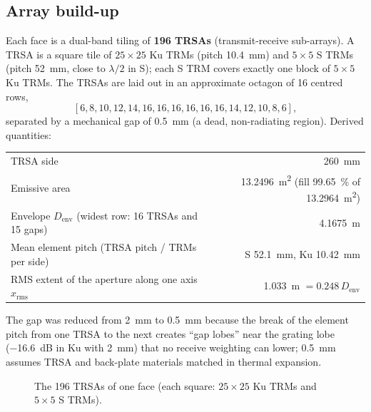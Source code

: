 \documentclass[11pt,a4paper]{article}
\newcommand{\Denv}{D_{\mathrm{env}}}
\begin{document}
\subsection{Array build-up}
Each face is a dual-band tiling of \textbf{196 TRSAs} (transmit-receive sub-arrays). A TRSA is a square tile of
$25\times25$ Ku TRMs (pitch \SI{10.4}{mm}) and $5\times5$ S TRMs (pitch \SI{52}{mm}, close to $\lambda/2$ in S); each
S TRM covers exactly one block of $5\times5$ Ku TRMs. The TRSAs are laid out in an approximate octagon of 16 centred
rows,
\[
  [6, 8, 10, 12, 14, 16, 16, 16, 16, 16, 16, 14, 12, 10, 8, 6],
\]
separated by a mechanical gap of \SI{0.5}{mm} (a dead, non-radiating region). Derived quantities:
\begin{center}
\begin{tabular}{@{}lr@{}}
\toprule
TRSA side & \SI{260}{mm}\\
Emissive area & \SI{13.2496}{m^2} (fill \SI{99.65}{\percent} of \SI{13.2964}{m^2})\\
Envelope $\Denv$ (widest row: 16 TRSAs and 15 gaps) & \SI{4.1675}{m}\\
Mean element pitch (TRSA pitch / TRMs per side) & S \SI{52.1}{mm}, Ku \SI{10.42}{mm}\\
RMS extent of the aperture along one axis $x_{\mathrm{rms}}$ & \SI{1.033}{m} $= 0.248\,\Denv$\\
\bottomrule
\end{tabular}
\end{center}
The gap was reduced from \SI{2}{mm} to \SI{0.5}{mm} because the break of the element pitch from one TRSA to the next
creates ``gap lobes'' near the grating lobe (\SI{-16.6}{dB} in Ku with \SI{2}{mm}) that no receive weighting can
lower; \SI{0.5}{mm} assumes TRSA and back-plate materials matched in thermal expansion.

\begin{figure}[ht]
\centering
{}
\caption{The 196 TRSAs of one face (each square: $25\times25$ Ku TRMs and $5\times5$ S TRMs).}
\label{fig:octagon}
\end{figure}
\end{document}
